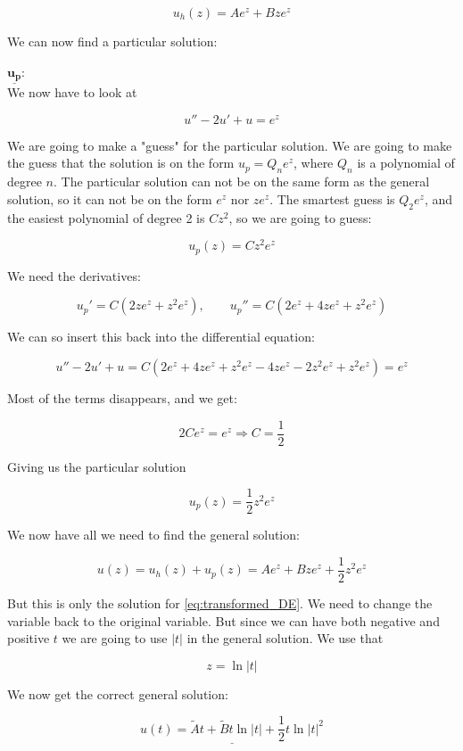 \documentclass[a4paper,norsk, 10pt]{article}
\begin{document}
\begin{equation}
u_h(z) = Ae^z + Bze^z
\end{equation}

We can now find a particular solution: \\

\newpage

$\underline{\mathbf{u_p}}$:\\

We now have to look at 

$$
u'' - 2u' + u = e^z
$$

We are going to make a "guess" for the 	particular solution. We are going to make the guess that the solution is on the form $u_p = Q_n e^z$, where $Q_n$ is a polynomial of degree $n$. The particular solution can not be on the same form as the general solution, so it can not be on the form $e^z$ nor $ze^z$. The smartest guess is $Q_2 e^z$, and the easiest polynomial of degree 2 is $Cz^2$, so we are going to guess:

$$
u_p(z) = Cz^2e^z
$$ 

We need the derivatives:

$$
u_p' = C(2ze^z + z^2e^z), \qquad u_p'' = C(2e^z + 4ze^z + z^2e^z)
$$

We can so insert this back into the differential equation:

$$
u'' - 2u' + u = C(2e^z + 4ze^z +z^2e^z - 4ze^z - 2z^2e^z + z^2e^z) = e^z
$$

Most of the terms disappears, and we get:

$$
2Ce^z = e^z \Rightarrow C = \frac{1}{2}
$$

Giving us the particular solution

$$
u_p(z) = \frac{1}{2}z^2 e^z
$$

We now have all we need to find the general solution:

$$
u(z) = u_h(z) + u_p(z) = Ae^z + Bze^z + \frac{1}{2}z^2 e^z
$$

But this is only the solution for \ref{eq:transformed_DE}. We need to change the variable back to the original variable. But since we can have both negative and positive $t$ we are going to use $|t|$ in the general solution. We use that

$$
z = \ln |t|
$$

We now get the correct general solution:

\begin{equation}
\underline{u(t) = \tilde{A}t + \tilde{B}t\ln |t| + \frac{1}{2}t \ln |t|^2}
\end{equation}
\end{document}
